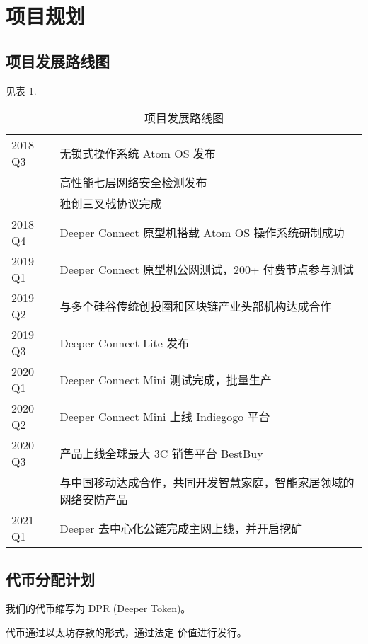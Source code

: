 \documentclass[a4paper]{article}
\begin{document}




\newpage
\section{项目规划}

\subsection{项目发展路线图}
见表 \ref{tab:roadmap}.

\begin{table} [hh]
\centering
\begin{tabular}{|l|p{12cm}|}
\hline
2018 Q3		& 无锁式操作系统 Atom OS 发布 \\
& 高性能七层网络安全检测发布 \\
& 独创三叉戟协议完成	 \\ \hline
2018 Q4		& Deeper Connect 原型机搭载 Atom OS 操作系统研制成功 \\ \hline
2019 Q1		& Deeper Connect 原型机公网测试，200+ 付费节点参与测试 \\ \hline
2019 Q2		& 与多个硅谷传统创投圈和区块链产业头部机构达成合作\\ \hline
2019 Q3		& Deeper Connect Lite 发布\\ \hline
2020 Q1    & Deeper Connect Mini 测试完成，批量生产\\ \hline
2020 Q2		& Deeper Connect Mini 上线 Indiegogo 平台 \\ \hline
2020 Q3		& 产品上线全球最大 3C 销售平台 BestBuy \\
& 与中国移动达成合作，共同开发智慧家庭，智能家居领域的网络安防产品\\ \hline
2021 Q1		& Deeper 去中心化公链完成主网上线，并开启挖矿\\ \hline
\end{tabular}
\caption{项目发展路线图} \label{tab:roadmap}
\end{table}

\subsection{代币分配计划}
我们的代币缩写为 DPR (Deeper Token)。

\noindent 代币通过以太坊存款的形式，通过法定
价值进行发行。
\end{document}
